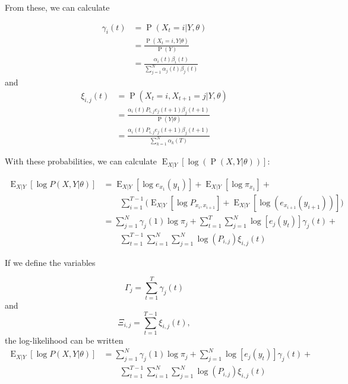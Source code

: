 \documentclass{article}
\DeclareMathOperator{\Prob}{P}
\DeclareMathOperator{\E}{E}
\begin{document}
From these, we can calculate 

\begin{align*}
    \gamma_i(t) &= \Prob(X_t=i|Y,\theta) \\
                &= \frac{\Prob(X_t=i,Y|\theta)}{\Prob(Y)}\\
                &= \frac{\alpha_i(t)\beta_i(t)}
                    {\sum_{j=1}^N\alpha_j(t)\beta_j(t)}
\end{align*}
and
\begin{align*}
    \xi_{i,j}(t) &= \Prob(X_t=i,X_{t+1}=j|Y,\theta) \\
                 &= \frac{\alpha_i(t)P_{i,j}e_j(t+1)\beta_j(t+1)}
                       {\Prob(Y|\theta)}\\
                 &= \frac{\alpha_i(t)P_{i,j}e_j(t+1)\beta_j(t+1)}
                       {\sum_{k=1}^N\alpha_k(T)}
\end{align*}

With these probabilities, we can calculate $\E_{X|Y}[\log(\Prob(X,Y|\theta))]$:

\begin{align*}
    \E_{X|Y}\left[\log P\left(X,Y|\theta\right)\right] &= 
        \E_{X|Y}\left[\log e_{x_1}(y_1)\right] + 
        \E_{X|Y}\left[\log \pi_{x_1}\right] + \\
        &\qquad
        \sum_{i=1}^{T-1}\bigg(\E_{X|Y}\left[\log P_{x_i,x_{i+1}}\right] +
        \E_{X|Y}\left[\log(e_{x_{i+1}}(y_{i+1}))\right]\bigg)\\
        &= \sum_{j=1}^N\gamma_j(1) \log \pi_j + 
        \sum_{t=1}^T\sum_{j=1}^N\log\left[e_j(y_t)\right]\gamma_j(t)+\\
        &\qquad\sum_{t=1}^{T-1}\sum_{i=1}^N\sum_{j=1}^N\log(P_{i,j})\xi_{i,j}(t)
\end{align*}

If we define the variables 

\begin{equation}
    \Gamma_j = \sum_{t=1}^T \gamma_j(t)
\end{equation}
and
\begin{equation}
    \Xi_{i,j} = \sum_{t=1}^{T-1}\xi_{i,j}(t),
\end{equation}
the log-likelihood can be written %
\begin{align*}
    \E_{X|Y}\left[\log P\left(X,Y|\theta\right)\right] &= 
        \sum_{j=1}^N\gamma_j(1) \log \pi_j + 
        \sum_{j=1}^N\log\left[e_j(y_t)\right]\gamma_j(t)+\\
        &\qquad\sum_{t=1}^{T-1}\sum_{i=1}^N\sum_{j=1}^N\log(P_{i,j})\xi_{i,j}(t)
\end{align*}
\end{document}
